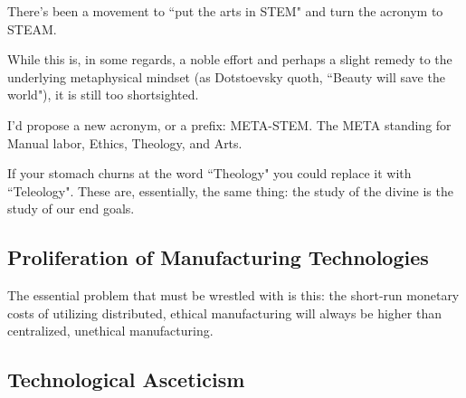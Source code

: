 \documentclass[letterpaper]{article}
\begin{document}
There's been a movement to ``put the arts in STEM" and turn the acronym to STEAM.

While this is, in some regards, a noble effort and perhaps a slight remedy to the underlying metaphysical mindset (as Dotstoevsky quoth, ``Beauty will save the world"), it is still too shortsighted.

I'd propose a new acronym, or a prefix: META-STEM. The META standing for Manual labor, Ethics, Theology, and Arts.

If your stomach churns at the word ``Theology" you could replace it with ``Teleology". These are, essentially, the same thing: the study of the divine is the study of our end goals.

\subsection{Proliferation of Manufacturing Technologies}

The essential problem that must be wrestled with is this: the short-run monetary costs of utilizing distributed, ethical manufacturing will always be higher than centralized, unethical manufacturing.

\subsection{Technological Asceticism}
\end{document}

